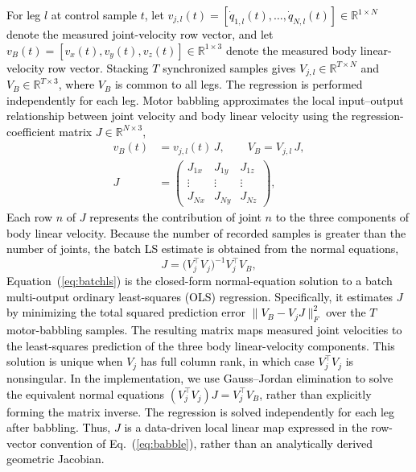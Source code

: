\documentclass[a4paper, 10pt, conference]{ieeeconf}
\newcommand{\vB}{v_B}
\newcommand{\Jm}{J}
\newcommand{\oldtext}[1]{\textcolor{red}{}}
\newcommand{\newtext}[1]{\textcolor{black}{#1}}
\begin{document}
\newtext{For leg $l$ at control sample $t$, let
$v_{j,l}(t)=[\dot q_{1,l}(t),\ldots,\dot q_{N,l}(t)]\in
\mathbb{R}^{1\times N}$ denote the measured joint-velocity row vector, and let
$\vB(t)=[v_x(t),v_y(t),v_z(t)]\in\mathbb{R}^{1\times3}$ denote the measured body
linear-velocity row vector. Stacking $T$ synchronized samples gives
$V_{j,l}\in\mathbb{R}^{T\times N}$ and $V_B\in\mathbb{R}^{T\times3}$, where
$V_B$ is common to all legs. The regression is performed independently for each
leg. Motor babbling approximates the local input--output relationship between
joint velocity and body linear velocity using the regression-coefficient matrix
$\Jm\in\mathbb{R}^{N\times3}$,}
\begin{equation}
  \begin{aligned}
    \vB(t) &= v_{j,l}(t)\,\Jm, \qquad V_B = V_{j,l}\,\Jm ,\\[2pt]
    \Jm &= \begin{pmatrix}
             J_{1x} & J_{1y} & J_{1z}\\
             \vdots & \vdots & \vdots\\
             J_{Nx} & J_{Ny} & J_{Nz}
           \end{pmatrix} ,
  \end{aligned}
  \label{eq:babble}
\end{equation}
\newtext{Each row $n$ of $\Jm$ represents the contribution of joint $n$ to the
three components of body linear velocity. Because the number of recorded samples
is greater than the number of joints, the batch LS estimate is obtained from the
normal equations,}
\begin{equation}
  \Jm = \bigl(V_j^{\top}V_j\bigr)^{-1}V_j^{\top}V_B ,
  \label{eq:batchls}
\end{equation}
\newtext{Equation~(\ref{eq:batchls}) is the closed-form normal-equation solution
to a batch multi-output ordinary least-squares (OLS) regression. Specifically,
it estimates $J$ by minimizing the total squared prediction error
$\lVert V_B-V_jJ\rVert_F^2$ over the $T$ motor-babbling samples. The resulting
matrix maps measured joint velocities to the least-squares prediction of the
three body linear-velocity components. This solution is unique when $V_j$ has
full column rank, in which case $V_j^{\top}V_j$ is nonsingular. In the
implementation, we use Gauss--Jordan elimination to solve the equivalent normal
equations $(V_j^{\top}V_j)J=V_j^{\top}V_B$, rather than explicitly forming the
matrix inverse. The regression is solved independently for each leg after
babbling. Thus, $J$ is a data-driven local linear map expressed in the row-vector
convention of Eq.~(\ref{eq:babble}), rather than an analytically derived
geometric Jacobian.}
\end{document}
